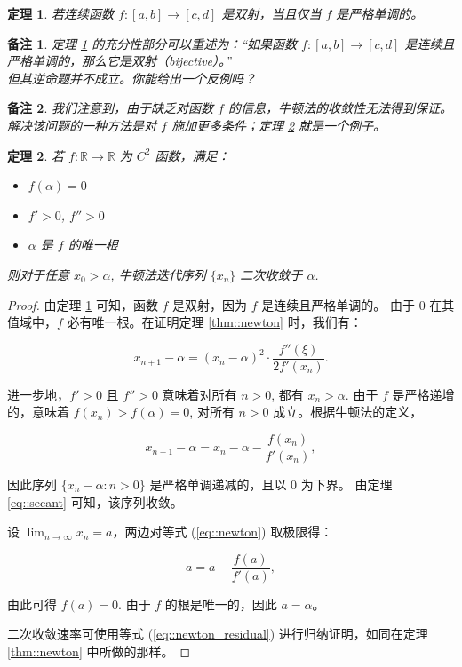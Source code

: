 \documentclass[a4paper]{ctexart}
\newtheorem{theorem}{定理}
\newtheorem{remark}{备注}
\numberwithin{theorem}{section}
\numberwithin{equation}{section}
\numberwithin{figure}{section}
\numberwithin{remark}{section}
\begin{document}
\begin{theorem}
    \label{thm::monotone}
若连续函数 \(f: [a,b] \to [c,d]\) 是双射，当且仅当 \(f\) 是严格单调的。
\end{theorem}

\begin{remark}
定理 \ref{thm::monotone} 的充分性部分可以重述为：“如果函数 \( f : [a, b] \to [c, d] \) 是连续且严格单调的，那么它是双射（bijective）。”\\
但其逆命题并不成立。你能给出一个反例吗？
\end{remark}

\begin{remark}
我们注意到，由于缺乏对函数 \( f \) 的信息，牛顿法的收敛性无法得到保证。解决该问题的一种方法是对 \( f \) 施加更多条件；定理 \ref{thm::newton_monotone} 就是一个例子。
\end{remark}

\begin{theorem}
    \label{thm::newton_monotone}    
若 \(f : \mathbb{R} \to \mathbb{R}\) 为 \(C^2\) 函数，满足：
\begin{itemize}
    \item \(f(\alpha) = 0\)
    \item \(f' > 0\), \(f'' > 0\)
    \item \(\alpha\) 是 \(f\) 的唯一根
\end{itemize}
则对于任意 \(x_0 > \alpha\), 牛顿法迭代序列 \(\{x_n\}\) 二次收敛于 \(\alpha\).    
\end{theorem}

\begin{proof}
由定理 \ref{thm::monotone} 可知，函数 \( f \) 是双射，因为 \( f \) 是连续且严格单调的。
由于 \( 0 \) 在其值域中，\( f \) 必有唯一根。在证明定理 \ref{thm::newton} 时，我们有：

\begin{equation}
    \label{eq::newton_residual}
x_{n+1} - \alpha = (x_n - \alpha)^2 \cdot \frac{f''(\xi)}{2 f'(x_n)}. 
\end{equation}

进一步地，\( f' > 0 \) 且 \( f'' > 0 \) 意味着对所有 \( n > 0 \), 
都有 \( x_n > \alpha \). 由于 \( f \) 是严格递增的，意味着 \( f(x_n) > f(\alpha) = 0 \), 
对所有 \( n > 0 \) 成立。根据牛顿法的定义，

\[
x_{n+1} - \alpha = x_n - \alpha - \frac{f(x_n)}{f'(x_n)},
\]

因此序列 \( \{x_n - \alpha : n > 0\} \) 是严格单调递减的，且以 $0$ 为下界。
由定理 \ref{eq::secant} 可知，该序列收敛。

设 \( \lim_{n \to \infty} x_n = a \)，两边对等式 (\ref{eq::newton}) 取极限得：

\[
a = a - \frac{f(a)}{f'(a)},
\]

由此可得 \( f(a) = 0 \). 由于 \( f \) 的根是唯一的，因此 \( a = \alpha \)。

二次收敛速率可使用等式 (\ref{eq::newton_residual}) 进行归纳证明，如同在定理 \ref{thm::newton} 中所做的那样。
\end{proof}
\end{document}
